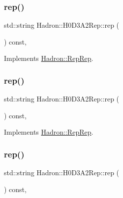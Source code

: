 \subsubsection{\texorpdfstring{rep()}{rep()}\hspace{0.1cm}{\footnotesize\ttfamily [2/5]}}
{\footnotesize\ttfamily std\+::string Hadron\+::\+H0\+D3\+A2\+Rep\+::rep (\begin{DoxyParamCaption}{ }\end{DoxyParamCaption}) const\hspace{0.3cm}{\ttfamily [inline]}, {\ttfamily [virtual]}}



Implements \mbox{\hyperlink{structHadron_1_1RepRep_ab3213025f6de249f7095892109575fde}{Hadron\+::\+Rep\+Rep}}.

\mbox{\label{structHadron_1_1H0D3A2Rep_a11e300b7b2215df67123d3d9e8747cb6}} 
\subsubsection{\texorpdfstring{rep()}{rep()}\hspace{0.1cm}{\footnotesize\ttfamily [3/5]}}
{\footnotesize\ttfamily std\+::string Hadron\+::\+H0\+D3\+A2\+Rep\+::rep (\begin{DoxyParamCaption}{ }\end{DoxyParamCaption}) const\hspace{0.3cm}{\ttfamily [inline]}, {\ttfamily [virtual]}}



Implements \mbox{\hyperlink{structHadron_1_1RepRep_ab3213025f6de249f7095892109575fde}{Hadron\+::\+Rep\+Rep}}.

\mbox{\label{structHadron_1_1H0D3A2Rep_a11e300b7b2215df67123d3d9e8747cb6}} 
\subsubsection{\texorpdfstring{rep()}{rep()}\hspace{0.1cm}{\footnotesize\ttfamily [4/5]}}
{\footnotesize\ttfamily std\+::string Hadron\+::\+H0\+D3\+A2\+Rep\+::rep (\begin{DoxyParamCaption}{ }\end{DoxyParamCaption}) const\hspace{0.3cm}{\ttfamily [inline]}, {\ttfamily [virtual]}}



